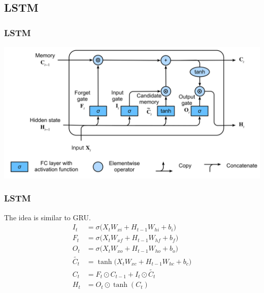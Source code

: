 \documentclass[]{beamer}
\begin{document}
\subsection{LSTM}
\begin{frame}
    \frametitle{LSTM}
    \includegraphics[scale = 0.1]{LSTM.png}
\end{frame}
\begin{frame}
    \frametitle{LSTM}
    The idea is similar to GRU\@.
    \begin{align*}
        I_t &= \sigma\bigl(X_t W_{xi} + H_{t-1}W_{hi} + b_i\bigr) \\
        F_t &= \sigma\bigl(X_t W_{xf} + H_{t-1} W_{hf} + b_f\bigr) \\
        O_t &= \sigma\bigl(X_t W_{xo} + H_{t-1} W_{ho} + b_o\bigr) \\
        \tilde{C_t} &= \tanh \bigl(X_t W_{xc} + H_{t-1}W_{hc} + b_c\bigr) \\
        C_t &= F_t \odot C_{t-1} + I_t \odot \tilde{C_t} \\
        H_t &= O_t \odot \tanh(C_t)
    \end{align*}
\end{frame}
\end{document}
